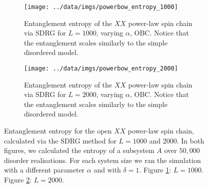 \begin{figure}[h]
     \centering
     \begin{subfigure}[b]{\textwidth}
       \centering
    \texttt{[image: ../data/imgs/powerbow\_entropy\_1000]}
    \caption{Entanglement entropy of the $XX$ power-law spin chain via SDRG for $L = 1000$, varying $\alpha$, OBC. Notice that the entanglement scales similarly to the simple disordered model.}
    \label{fig:powerbow_entropy_1000}
   
    \end{subfigure}%
     \hfill
     \begin{subfigure}[b]{\textwidth}
         \centering
    \texttt{[image: ../data/imgs/powerbow\_entropy\_2000]}
    \caption{Entanglement entropy of the $XX$ power-law spin chain via SDRG for $L = 2000$, varying $\alpha$, OBC. Notice that the entanglement scales similarly to the simple disordered model.}
    \label{fig:powerbow_entropy_2000}

         \end{subfigure}
            \caption{Entanglement entropy for the open $XX$ power-law spin chain, calculated via the SDRG method for $L = 1000$ and $2000$. In both figures, we calculated the entropy of a subsystem $A$ over $50,000$ disorder realisations. For each system size we ran the simulation with a different parameter $\alpha$ and with $\delta = 1$. Figure \ref{fig:powerbow_entropy_1000}: $L = 1000$. Figure \ref{fig:powerbow_entropy_2000}: $L = 2000$.}
        \label{fig:powerbow_entropy}
\end{figure}





